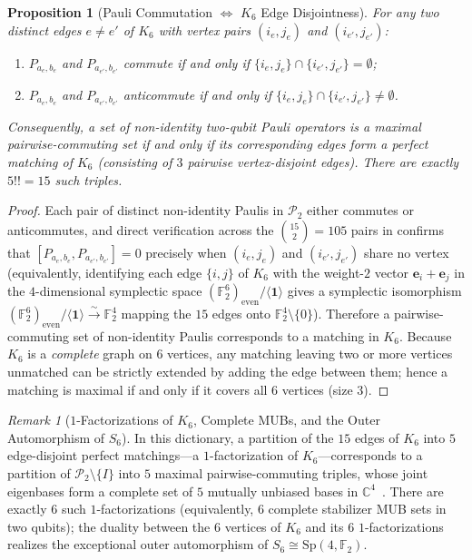 \documentclass[11pt,a4paper]{article}
\theoremstyle{plain}
\newtheorem{proposition}[theorem]{Proposition}
\theoremstyle{definition}
\theoremstyle{remark}
\newtheorem{remark}[theorem]{Remark}
\newcommand{\C}{\mathbb{C}}
\newcommand{\F}{\mathbb{F}}
\newcommand{\Sp}{\mathrm{Sp}}
\newcommand{\Pauli}{\mathcal{P}}
\begin{document}
\begin{proposition}[Pauli Commutation $\iff$ $K_6$ Edge Disjointness]
\label{prop:comm-disjoint}
For any two distinct edges $e \neq e'$ of $K_6$ with vertex pairs $(i_e, j_e)$ and $(i_{e'}, j_{e'})$:
\begin{enumerate}[label=\textup{(\alph*)}, leftmargin=2em]
  \item $P_{a_e, b_e}$ and $P_{a_{e'}, b_{e'}}$ commute if and only if $\{i_e, j_e\} \cap \{i_{e'}, j_{e'}\} = \emptyset$;
  \item $P_{a_e, b_e}$ and $P_{a_{e'}, b_{e'}}$ anticommute if and only if $\{i_e, j_e\} \cap \{i_{e'}, j_{e'}\} \neq \emptyset$.
\end{enumerate}
Consequently, a set of non-identity two-qubit Pauli operators is a \emph{maximal pairwise-commuting set} if and only if its corresponding edges form a \emph{perfect matching} of $K_6$ (consisting of $3$ pairwise vertex-disjoint edges). There are exactly $5!! = 15$ such triples.
\end{proposition}

\begin{proof}
Each pair of distinct non-identity Paulis in $\Pauli_2$ either commutes or anticommutes, and direct verification across the $\binom{15}{2} = 105$ pairs in  confirms that $[P_{a_e, b_e}, P_{a_{e'}, b_{e'}}] = 0$ precisely when $(i_e, j_e)$ and $(i_{e'}, j_{e'})$ share no vertex (equivalently, identifying each edge $\{i,j\}$ of $K_6$ with the weight-$2$ vector $\mathbf{e}_i + \mathbf{e}_j$ in the $4$-dimensional symplectic space $(\F_2^6)_{\mathrm{even}}/\langle\mathbf{1}\rangle$ gives a symplectic isomorphism $(\F_2^6)_{\mathrm{even}}/\langle\mathbf{1}\rangle \xrightarrow{\sim} \F_2^4$ mapping the $15$ edges onto $\F_2^4\setminus\{0\}$). Therefore a pairwise-commuting set of non-identity Paulis corresponds to a matching in $K_6$. Because $K_6$ is a \emph{complete} graph on $6$ vertices, any matching leaving two or more vertices unmatched can be strictly extended by adding the edge between them; hence a matching is maximal if and only if it covers all $6$ vertices (size $3$).
\end{proof}

\begin{remark}[$1$-Factorizations of $K_6$, Complete MUBs, and the Outer Automorphism of $S_6$]
In this dictionary, a partition of the $15$ edges of $K_6$ into $5$ edge-disjoint perfect matchings---a $1$-factorization of $K_6$---corresponds to a partition of $\Pauli_2 \setminus \{I\}$ into $5$ maximal pairwise-commuting triples, whose joint eigenbases form a complete set of $5$ mutually unbiased bases in $\C^4$~\cite{LawrenceBruknerZeilinger2002,KlappeneckerRotteler2004}. There are exactly $6$ such $1$-factorizations (equivalently, $6$ complete stabilizer MUB sets in two qubits); the duality between the $6$ vertices of $K_6$ and its $6$ $1$-factorizations realizes the exceptional outer automorphism of $S_6 \cong \Sp(4,\F_2)$.
\end{remark}
\end{document}
